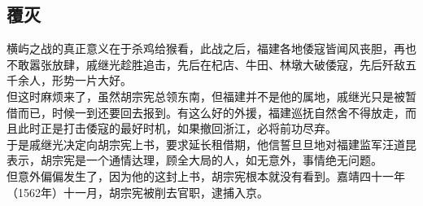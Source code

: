 \begin{multicols}{\theparacolNo}
\subsection{覆灭}
横屿之战的真正意义在于杀鸡给猴看，此战之后，福建各地倭寇皆闻风丧胆，再也不敢嚣张放肆，戚继光趁胜追击，先后在杞店、牛田、林墩大破倭寇，先后歼敌五千余人，形势一片大好。\\

但这时麻烦来了，虽然胡宗宪总领东南，但福建并不是他的属地，戚继光只是被暂借而已，时候一到还要回去报到。有这么好的外援，福建巡抚自然舍不得放走，而且此时正是打击倭寇的最好时机，如果撤回浙江，必将前功尽弃。\\

于是戚继光决定向胡宗宪上书，要求延长租借期，他信誓旦旦地对福建监军汪道昆表示，胡宗宪是一个通情达理，顾全大局的人，如无意外，事情绝无问题。\\

但意外偏偏发生了，因为他的这封上书，胡宗宪根本就没有看到。嘉靖四十一年（1562年）十一月，胡宗宪被削去官职，逮捕入京。\\
\ifnum{}
	\end{multicols}
\fi
\newpage
